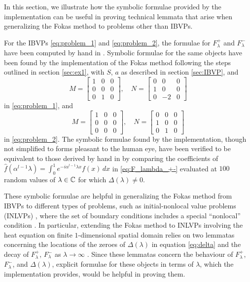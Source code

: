 \documentclass[11pt, oneside, a4paper]{article}
\begin{document}
In this section, we illustrate how the symbolic formulae provided by the implementation can be useful in proving technical lemmata that arise when generalizing the Fokas method to problems other than IBVPs. 

For the IBVPs \eqref{eq:problem_1} and \eqref{eq:problem_2}, the formulae for $F_\lambda^+$ and $F_\lambda^-$ have been computed by hand in \cite[p. 1-4]{Smith2016}. Symbolic formulae for the same objects have been found by the implementation of the Fokas method following the steps outlined in section \ref{sec:ex1}, with $S$, $a$ as described in section \ref{sec:IBVP}, and
\[M = \begin{bmatrix}1 & 0 & 0\\ 0 & 0 & 0\\ 0 & 1 & 0\end{bmatrix},\quad N = \begin{bmatrix} 0 & 0 & 0\\ 1 & 0 & 0 \\ 0 & -2 & 0\end{bmatrix}\]
in \eqref{eq:problem_1}, and 
\[M = \begin{bmatrix}1 & 0 & 0\\ 0 & 0 & 0\\ 0 & 0 & 0\end{bmatrix},\quad N = \begin{bmatrix} 0 & 0 & 0\\ 1 & 0 & 0 \\ 0 & 1 & 0\end{bmatrix}\]
in \eqref{eq:problem_2}. The symbolic formulae found by the implementation, though not simplified to forms pleasant to the human eye, have been verified to be equivalent to those derived by hand in \cite{Smith2016} by comparing the coefficients of $\hat{f}(\alpha^{l-1}\lambda) = \int_0^1 e^{-i\alpha^{l-1}\lambda x}f(x)\,dx$ in \eqref{eq:F_lambda_+-} evaluated at $100$ random values of $\lambda\in\mathbb C$ for which $\Delta(\lambda)\neq 0$.

These symbolic formulae are helpful in generalizing the Fokas method from IBVPs to different types of problems, such as initial-nonlocal value problems (INLVPs) \cite{Miller2018}, where the set of boundary conditions includes a special ``nonlocal'' condition \cite{Miller2018}. In particular, extending the Fokas method to INLVPs involving the heat equation on finite $1$-dimensional spatial domain relies on two lemmatas concerning the locations of the zeroes of $\Delta(\lambda)$ in equation \eqref{eq:delta} and the decay of $F_\lambda^+$, $F_\lambda^-$ as $\lambda\to\infty$ \cite[p. 4]{Miller2018}. Since these lemmatas concern the behaviour of $F_\lambda^+$, $F_\lambda^-$, and $\Delta(\lambda)$, explicit formulae for these objects in terms of $\lambda$, which the implementation provides, would be helpful in proving them.
\end{document}
